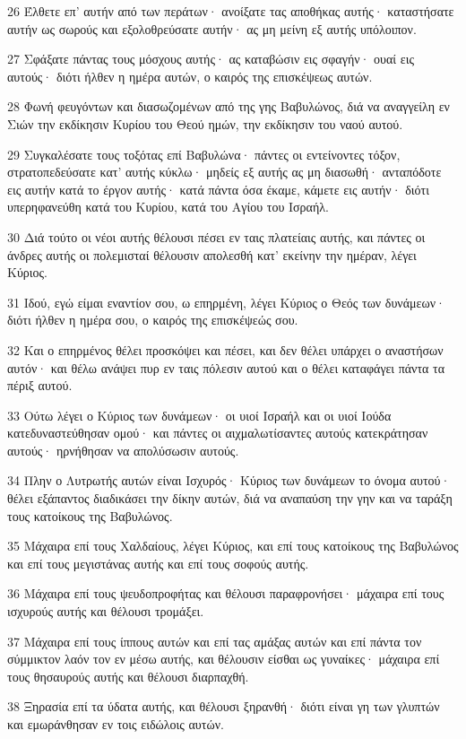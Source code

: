 \par 26 Έλθετε επ' αυτήν από των περάτων· ανοίξατε τας αποθήκας αυτής· καταστήσατε αυτήν ως σωρούς και εξολοθρεύσατε αυτήν· ας μη μείνη εξ αυτής υπόλοιπον.
\par 27 Σφάξατε πάντας τους μόσχους αυτής· ας καταβώσιν εις σφαγήν· ουαί εις αυτούς· διότι ήλθεν η ημέρα αυτών, ο καιρός της επισκέψεως αυτών.
\par 28 Φωνή φευγόντων και διασωζομένων από της γης Βαβυλώνος, διά να αναγγείλη εν Σιών την εκδίκησιν Κυρίου του Θεού ημών, την εκδίκησιν του ναού αυτού.
\par 29 Συγκαλέσατε τους τοξότας επί Βαβυλώνα· πάντες οι εντείνοντες τόξον, στρατοπεδεύσατε κατ' αυτής κύκλω· μηδείς εξ αυτής ας μη διασωθή· ανταπόδοτε εις αυτήν κατά το έργον αυτής· κατά πάντα όσα έκαμε, κάμετε εις αυτήν· διότι υπερηφανεύθη κατά του Κυρίου, κατά του Αγίου του Ισραήλ.
\par 30 Διά τούτο οι νέοι αυτής θέλουσι πέσει εν ταις πλατείαις αυτής, και πάντες οι άνδρες αυτής οι πολεμισταί θέλουσιν απολεσθή κατ' εκείνην την ημέραν, λέγει Κύριος.
\par 31 Ιδού, εγώ είμαι εναντίον σου, ω επηρμένη, λέγει Κύριος ο Θεός των δυνάμεων· διότι ήλθεν η ημέρα σου, ο καιρός της επισκέψεώς σου.
\par 32 Και ο επηρμένος θέλει προσκόψει και πέσει, και δεν θέλει υπάρχει ο αναστήσων αυτόν· και θέλω ανάψει πυρ εν ταις πόλεσιν αυτού και ο θέλει καταφάγει πάντα τα πέριξ αυτού.
\par 33 Ούτω λέγει ο Κύριος των δυνάμεων· οι υιοί Ισραήλ και οι υιοί Ιούδα κατεδυναστεύθησαν ομού· και πάντες οι αιχμαλωτίσαντες αυτούς κατεκράτησαν αυτούς· ηρνήθησαν να απολύσωσιν αυτούς.
\par 34 Πλην ο Λυτρωτής αυτών είναι Ισχυρός· Κύριος των δυνάμεων το όνομα αυτού· θέλει εξάπαντος διαδικάσει την δίκην αυτών, διά να αναπαύση την γην και να ταράξη τους κατοίκους της Βαβυλώνος.
\par 35 Μάχαιρα επί τους Χαλδαίους, λέγει Κύριος, και επί τους κατοίκους της Βαβυλώνος και επί τους μεγιστάνας αυτής και επί τους σοφούς αυτής.
\par 36 Μάχαιρα επί τους ψευδοπροφήτας και θέλουσι παραφρονήσει· μάχαιρα επί τους ισχυρούς αυτής και θέλουσι τρομάξει.
\par 37 Μάχαιρα επί τους ίππους αυτών και επί τας αμάξας αυτών και επί πάντα τον σύμμικτον λαόν τον εν μέσω αυτής, και θέλουσιν είσθαι ως γυναίκες· μάχαιρα επί τους θησαυρούς αυτής και θέλουσι διαρπαχθή.
\par 38 Ξηρασία επί τα ύδατα αυτής, και θέλουσι ξηρανθή· διότι είναι γη των γλυπτών και εμωράνθησαν εν τοις ειδώλοις αυτών.
